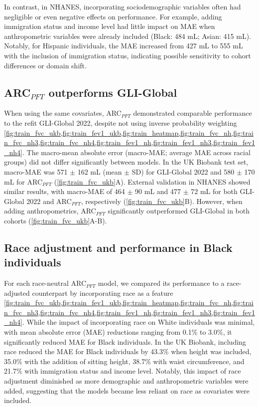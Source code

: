 \documentclass[10pt]{extarticle}
\begin{document}
In contrast, in NHANES, incorporating sociodemographic variables often had negligible or even negative effects on performance. For example, adding immigration status and income level had little impact on MAE when anthropometric variables were already included (Black: 484 mL; Asian: 415 mL). Notably, for Hispanic individuals, the MAE increased from 427 mL to 555 mL with the inclusion of immigration status, indicating possible sensitivity to cohort differences or domain shift.

\subsection{ARC$_{PFT}$ outperforms GLI-Global}
When using the same covariates, ARC$_{PFT}$ demonstrated comparable performance to the refit GLI-Global 2022, despite not using inverse probability weighting \cref{fig:train_fvc_ukb,fig:train_fev1_ukb,fig:train_heatmap,fig:train_fvc_nh,fig:train_fvc_nh3,fig:train_fvc_nh4,fig:train_fev1_nh,fig:train_fev1_nh3,fig:train_fev1_nh4}. The macro-mean absolute error (macro-MAE; average MAE across racial groups) did not differ significantly between models. In the UK Biobank test set, macro-MAE was 571 $\pm$ 162 mL (mean $\pm$ SD) for GLI-Global 2022 and 580 $\pm$ 170 mL for ARC$_{PFT}$ (\cref{fig:train_fvc_ukb}A). External validation in NHANES showed similar results, with macro-MAE of 464 $\pm$ 90 mL and 477 $\pm$ 72 mL for both GLI-Global 2022 and ARC$_{PFT}$, respectively (\cref{fig:train_fvc_ukb}B). However, when adding anthropometrics, ARC$_{PFT}$ significantly outperformed GLI-Global in both cohorts (\cref{fig:train_fvc_ukb}A-B).

\subsection{Race adjustment and performance in Black individuals}\label{ARC_NatureHealth_v2:race-adjustment-and-performance-in-black-individuals}

For each race-neutral ARC$_{PFT}$ model, we compared its performance to a race-adjusted counterpart by incorporating race as a feature \cref{fig:train_fvc_ukb,fig:train_fev1_ukb,fig:train_heatmap,fig:train_fvc_nh,fig:train_fvc_nh3,fig:train_fvc_nh4,fig:train_fev1_nh,fig:train_fev1_nh3,fig:train_fev1_nh4}. While the impact of incorporating race on White individuals was minimal, with mean absolute error (MAE) reductions ranging from 0.1\% to 3.0\%, it significantly reduced MAE for Black individuals. In the UK Biobank, including race reduced the MAE for Black individuals by 43.3\% when height was included, 35.0\% with the addition of sitting height, 38.7\% with waist circumference, and 21.7\% with immigration status and income level. Notably, this impact of race adjustment diminished as more demographic and anthropometric variables were added, suggesting that the models became less reliant on race as covariates were included.
\end{document}
